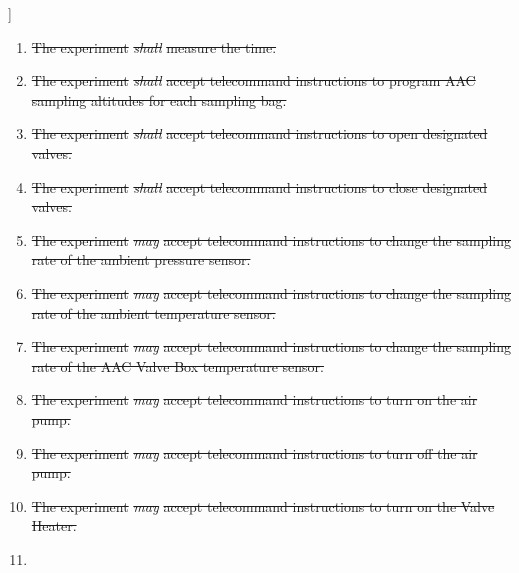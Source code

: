 ]\documentclass[a4paper,12pt,twoside]{article}
\providecommand{\DIFdeltex}[1]{{\protect\color{red}\sout{#1}}}                      %
\providecommand{\DIFdel}[1]{\texorpdfstring{\DIFdeltex{#1}}{}} %
\begin{document}
\begin{enumerate}
\item%
\DIFdel{The experiment }\textit{\DIFdel{shall}} %
\DIFdel{measure the time.
    }%
\item%
\DIFdel{The experiment }\textit{\DIFdel{shall}} %
\DIFdel{accept telecommand instructions to program AAC sampling altitudes for each sampling bag.
    }%
\item%
\DIFdel{The experiment }\textit{\DIFdel{shall}} %
\DIFdel{accept telecommand instructions to open designated valves.
    }%
\item%
\DIFdel{The experiment }\textit{\DIFdel{shall}} %
\DIFdel{accept telecommand instructions to close designated valves.
    }%
\item%
\DIFdel{The experiment }\textit{\DIFdel{may}} %
\DIFdel{accept telecommand instructions to change the sampling rate of the ambient pressure sensor.
    }%
\item%
\DIFdel{The experiment }\textit{\DIFdel{may}} %
\DIFdel{accept telecommand instructions to change the sampling rate of the ambient temperature sensor.
    }%
\item%
\DIFdel{The experiment }\textit{\DIFdel{may}} %
\DIFdel{accept telecommand instructions to change the sampling rate of the AAC Valve Box temperature sensor.
    }%
\item%
\DIFdel{The experiment }\textit{\DIFdel{may}} %
\DIFdel{accept telecommand instructions to turn on the air pump.
    }%
\item%
\DIFdel{The experiment }\textit{\DIFdel{may}} %
\DIFdel{accept telecommand instructions to turn off the air pump.
    }%
\item%
\DIFdel{The experiment }\textit{\DIFdel{may}} %
\DIFdel{accept telecommand instructions to turn on the Valve Heater.
    }%
\item%

\end{enumerate}
\end{document}
